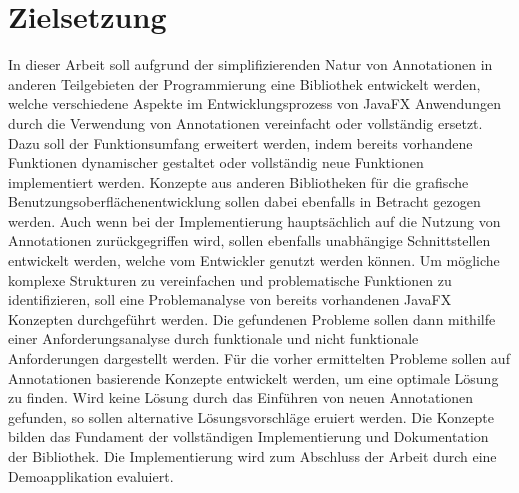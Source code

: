\section{Zielsetzung}
\label{zielsetzung}
In dieser Arbeit soll aufgrund der simplifizierenden Natur von Annotationen in anderen Teilgebieten der Programmierung eine Bibliothek entwickelt werden, welche verschiedene Aspekte im Entwicklungsprozess von JavaFX Anwendungen durch die Verwendung von Annotationen vereinfacht oder vollständig ersetzt. Dazu soll der Funktionsumfang erweitert werden, indem bereits vorhandene Funktionen dynamischer gestaltet oder vollständig neue Funktionen implementiert werden. Konzepte aus anderen Bibliotheken für die grafische Benutzungsoberflächenentwicklung sollen dabei ebenfalls in Betracht gezogen werden. Auch wenn bei der Implementierung hauptsächlich auf die Nutzung von Annotationen zurückgegriffen wird, sollen ebenfalls unabhängige Schnittstellen entwickelt werden, welche vom Entwickler genutzt werden können. Um mögliche komplexe Strukturen zu vereinfachen und problematische Funktionen zu identifizieren, soll eine Problemanalyse von bereits vorhandenen JavaFX Konzepten durchgeführt werden. Die gefundenen Probleme sollen dann mithilfe einer Anforderungsanalyse durch funktionale und nicht funktionale Anforderungen dargestellt werden. Für die vorher ermittelten Probleme sollen auf Annotationen basierende Konzepte entwickelt werden, um eine optimale Lösung zu finden. Wird keine Lösung durch das Einführen von neuen Annotationen gefunden, so sollen alternative Lösungsvorschläge eruiert werden. Die Konzepte bilden das Fundament der vollständigen Implementierung und Dokumentation der Bibliothek. Die Implementierung wird zum Abschluss der Arbeit durch eine Demoapplikation evaluiert.
